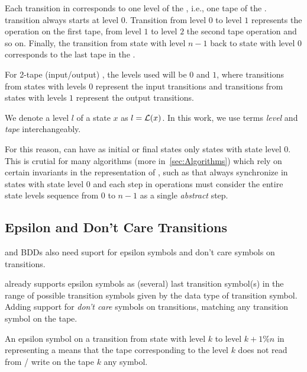 Each transition in \nfaClass corresponds to one level of the \nft, i.e., one tape of the \nft.
\nft transition always starts at level $0$. Transition from level $0$ to level $1$ represents the operation on the first \nft tape, from level $1$ to level $2$ the second \nft tape operation and so on.
Finally, the transition from state with level $n-1$ back to state with level $0$ corresponds to the last tape in the \nft.

For 2-tape (input/output) \nft, the levels used will be $0$ and $1$, where transitions from states with levels $0$ represent the input transitions and transitions from states with levels $1$ represent the output transitions.

We denote a level $l$ of a state $x$ as $l = \mathcal{L}(x)$.
In this work, we use terms \emph{level} and \emph{tape} interchangeably.

For this reason, \nfts can have as initial or final states only states with state level $0$.
This is crutial for many algorithms (more in~\ref{sec:Algorithms}) which rely on certain invariants in the representation of \nfts, such as that \nfts always synchronize in states with state level $0$ and each step in operations must consider the entire state levels sequence from $0$ to $n-1$ as a single \emph{abstract} step.

\subsection{Epsilon and Don't Care Transitions}

\nfts and BDDs also need suport for epsilon symbols and don't care symbols on transitions.

\mata already supports epsilon symbols as (several) last transition symbol(s) in the range of possible transition symbols given by the data type of transition symbol.
Adding support for \emph{don't care} symbols on transitions, matching any transition symbol on the tape.

An epsilon symbol on a transition from state with level $k$ to level $k + 1 \% n$ in \nfaClass representing a \nft means that the tape corresponding to the level $k$ does not read from / write on the tape $k$ any symbol.

